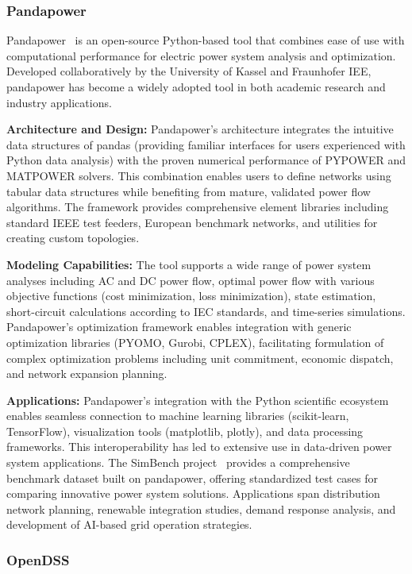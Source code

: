 \subsubsection{Pandapower}

Pandapower~\cite{pandapower} is an open-source Python-based tool that combines ease of use with computational performance for electric power system analysis and optimization. Developed collaboratively by the University of Kassel and Fraunhofer IEE, pandapower has become a widely adopted tool in both academic research and industry applications.

\textbf{Architecture and Design:} Pandapower's architecture integrates the intuitive data structures of pandas (providing familiar interfaces for users experienced with Python data analysis) with the proven numerical performance of PYPOWER and MATPOWER solvers. This combination enables users to define networks using tabular data structures while benefiting from mature, validated power flow algorithms. The framework provides comprehensive element libraries including standard IEEE test feeders, European benchmark networks, and utilities for creating custom topologies.

\textbf{Modeling Capabilities:} The tool supports a wide range of power system analyses including AC and DC power flow, optimal power flow with various objective functions (cost minimization, loss minimization), state estimation, short-circuit calculations according to IEC standards, and time-series simulations. Pandapower's optimization framework enables integration with generic optimization libraries (PYOMO, Gurobi, CPLEX), facilitating formulation of complex optimization problems including unit commitment, economic dispatch, and network expansion planning.

\textbf{Applications:} Pandapower's integration with the Python scientific ecosystem enables seamless connection to machine learning libraries (scikit-learn, TensorFlow), visualization tools (matplotlib, plotly), and data processing frameworks. This interoperability has led to extensive use in data-driven power system applications. The SimBench project~\cite{pandapower_application} provides a comprehensive benchmark dataset built on pandapower, offering standardized test cases for comparing innovative power system solutions. Applications span distribution network planning, renewable integration studies, demand response analysis, and development of AI-based grid operation strategies.


\subsubsection{OpenDSS}

